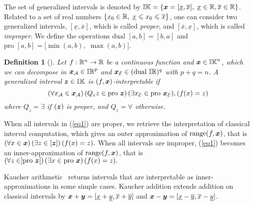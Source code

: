 \documentclass{sig-alternate-05-2015}
\newtheorem{definition}{Definition}
\DeclareMathOperator{\range}{range}
\newcommand{\pro}{\mbox{pro }}
\def\bbr{{\Bbb R}}
\def\I{{\Bbb I \Bbb R}}
\def\K{{\Bbb I \Bbb K}}
\begin{document}
The set of generalized
intervals is denoted by $\K = \{ \x=[\underline{x},\overline{x}], \; \underline{x} \in \bbr, \overline{x}  \in \bbr\}$.
Related to a set of real numbers $\{x_0 \in \bbr, \;  \underline{x} \leqslant x_0 \leqslant  \overline{x} \}$, one can consider two generalized 
intervals, $[\underline{x},\overline{x}]$, which is called \emph{proper}, and $[\overline{x},\underline{x}]$, which is called 
\emph{improper}. We define the operations $\mbox{dual } [a,b]=[b,a]$ and 
$\pro [a,b]=[\min(a,b),$ $\max(a,b)]$. 

\begin{definition} [\cite{gold1}]
\label{pb1}
Let $f : \bbr^n \rightarrow \bbr$ be a continuous function and $\x \in \K^n$, which we can decompose in $\x_{\cal A} \in \I^p$ 
and $\x_{\cal E} \in (\mbox{dual }\I)^q$ with $p+q=n$. A generalized interval 
$\z \in \K$ is $(f,\x)$-interpretable if
\begin{equation}
 (\forall x_{\cal A} \in \x_{\cal A})\, (Q_z z \in \pro \z)\, (\exists x_{\cal E} \in \pro \x_{\cal E}),
(f(x)=z)
\label{eq1}
\end{equation}
where $Q_z = \exists$ if $(\z)$ is proper, and  $Q_z = \forall$ otherwise. 
\end{definition}

When all intervals in (\ref{eq1}) are proper, we retrieve the interpretation of classical interval 
computation, which gives an outer approximation of $\range(f,\x)$, that is
$ (\forall x \in \x) \, (\exists z \in [\z]) \, (f(x)=z).    $
When all intervals are improper, (\ref{eq1}) becomes an inner-approx\-imation  of $\range(f,\x)$, that is
$ (\forall z \in ]\pro \z[) \, (\exists x \in \pro \x) \, (f(x)=z).    $

 Kaucher arithmetic~\cite{Kaucher} returns intervals that are interpretable as inner-approximations in some simple cases. 
Kau\-cher addition extends addition on classical intervals by $\x+\y=[\underline x + \underline y,\overline x + \overline y]$ and 
$\x-\y=[\underline x - \overline y,\overline x - \underline y]$.
\end{document}
